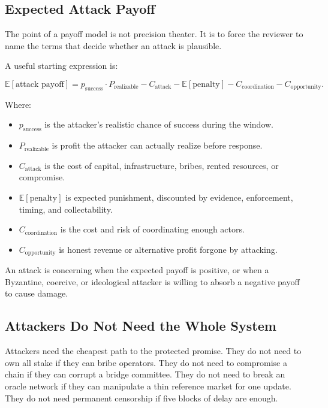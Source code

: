 \subsection{Expected Attack Payoff}

The point of a payoff model is not precision theater. It is to force the reviewer to name the terms that decide whether an attack is plausible.

A useful starting expression is:

\[
\mathbb{E}[\text{attack payoff}]
= p_{\text{success}} \cdot P_{\text{realizable}}
- C_{\text{attack}}
- \mathbb{E}[\text{penalty}]
- C_{\text{coordination}}
- C_{\text{opportunity}}.
\]

Where:

\begin{itemize}
\item \(p_{\text{success}}\) is the attacker's realistic chance of success during the window.
\item \(P_{\text{realizable}}\) is profit the attacker can actually realize before response.
\item \(C_{\text{attack}}\) is the cost of capital, infrastructure, bribes, rented resources, or compromise.
\item \(\mathbb{E}[\text{penalty}]\) is expected punishment, discounted by evidence, enforcement, timing, and collectability.
\item \(C_{\text{coordination}}\) is the cost and risk of coordinating enough actors.
\item \(C_{\text{opportunity}}\) is honest revenue or alternative profit forgone by attacking.
\end{itemize}

An attack is concerning when the expected payoff is positive, or when a Byzantine, coercive, or ideological attacker is willing to absorb a negative payoff to cause damage.

\subsection{Attackers Do Not Need the Whole System}

Attackers need the cheapest path to the protected promise. They do not need to own all stake if they can bribe operators. They do not need to compromise a chain if they can corrupt a bridge committee. They do not need to break an oracle network if they can manipulate a thin reference market for one update. They do not need permanent censorship if five blocks of delay are enough.

